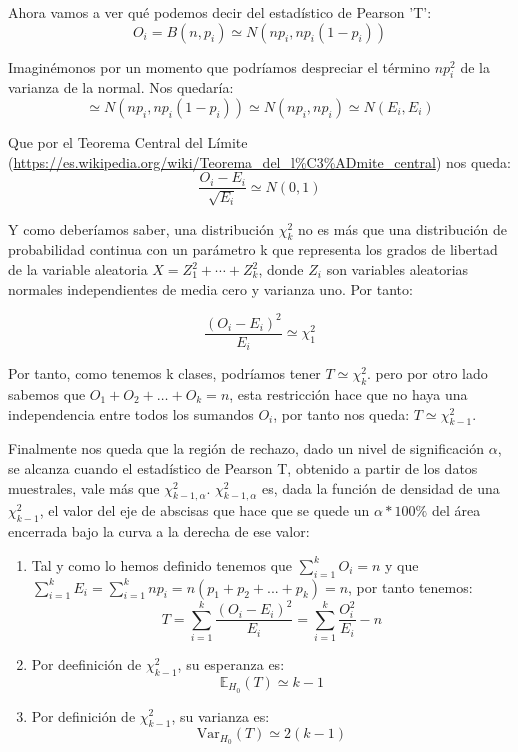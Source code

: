 \documentclass[palatino,nochap]{apuntes}
\begin{document}
Ahora vamos a ver qué podemos decir del estadístico de Pearson 'T':
\[
O_i=B(n,p_i) \simeq N(np_i, np_i(1-p_i))
\]

Imaginémonos por un momento que podríamos despreciar el término $np_i^2$ de la varianza de la normal. Nos quedaría:
\[
\simeq N(np_i, np_i(1-p_i)) \simeq N(np_i, np_i) \simeq N(E_i, E_i)
\]

Que por el Teorema Central del Límite (\url{https://es.wikipedia.org/wiki/Teorema_del_l%C3%ADmite_central}) nos queda:
\[
\frac{O_i-E_i}{\sqrt{E_i}} \simeq N(0,1)
\]

Y como deberíamos saber, una distribución $\chi^2_k$  no es más que una distribución de probabilidad continua con un parámetro k que representa los grados de libertad de la variable aleatoria $X = Z_1^2 + \cdots + Z_k^2$, donde $Z_i$ son variables aleatorias normales independientes de media cero y varianza uno. Por tanto:

\[
\frac{(O_i-E_i)^2}{E_i} \simeq \chi^2_1
\]

Por tanto, como tenemos k clases, podríamos tener $T\simeq \chi^2_k$. pero por otro lado sabemos que $O_1+O_2+…+O_k=n$, esta restricción hace que no haya una independencia entre todos los sumandos $O_i$, por tanto nos queda: $T\simeq \chi^2_{k-1}$.

Finalmente nos queda que la región de rechazo, dado un nivel de significación $\alpha$, se alcanza cuando el estadístico de Pearson T, obtenido a partir de los datos muestrales, vale más que $\chi^2_{k-1,α}$. $\chi^2_{k-1,α}$ es, dada la función de densidad de una $\chi^2_{k-1}$, el valor del eje de abscisas que hace que se quede un $\alpha*100\%$ del área encerrada bajo la curva a la derecha de ese valor:


\obs
\begin{enumerate}
\item  Tal y como lo hemos definido tenemos que $\sum_{i=1}^k O_i = n$ y que $\sum_{i=1}^k E_i = \sum_{i=1}^k np_i= n(p_1+p_2+...+p_k) = n$, por tanto tenemos:
\[
T=\sum_{i=1}^k \frac{(O_i-E_i)^2}{E_i} = \sum_{i=1}^k \frac{O_i^2}{E_i}-n
\]

\item Por deefinición de $\chi^2_{k-1}$, su esperanza es:
\[
\mathbb{E}_{H_0}(T) \simeq k-1
\]

\item Por definición de $\chi^2_{k-1}$, su varianza es:
\[
\mathrm{Var}_{H_0}(T) \simeq 2(k-1)
\]




\end{enumerate}
\end{document}
